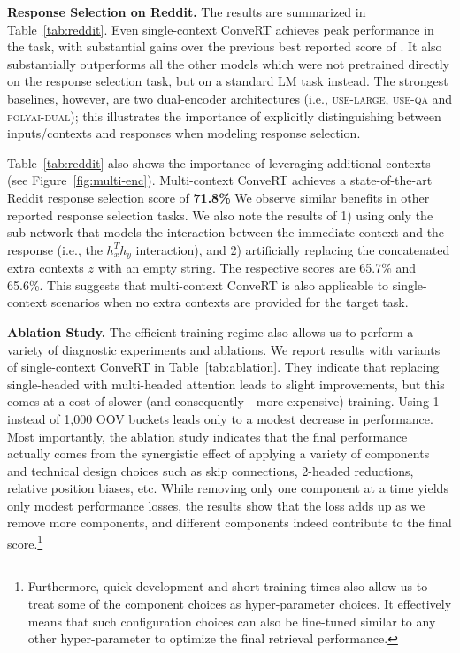 \documentclass[11pt,a4paper]{article}
\begin{document}
\vspace{1.3mm}
\noindent \textbf{Response Selection on Reddit.}
The results are summarized in Table~\ref{tab:reddit}. Even single-context ConveRT achieves peak performance in the task, with substantial gains over the previous best reported score of . It also substantially outperforms all the other models which were not pretrained directly on the response selection task, but on a standard LM task instead. The strongest baselines, however, are two dual-encoder architectures (i.e., \textsc{use-large}, \textsc{use-qa} and \textsc{polyai-dual}); this illustrates the importance of explicitly distinguishing between inputs/contexts and responses when modeling response selection. 

Table~\ref{tab:reddit} also shows the importance of leveraging additional contexts (see Figure~\ref{fig:multi-enc}). Multi-context ConveRT achieves a state-of-the-art Reddit response selection score of \textbf{71.8\%} We observe similar benefits in other reported response selection tasks. We also note the results of 1) using only the sub-network that models the interaction between the immediate context and the response (i.e., the $h_{x}^{T} h_{y}$ interaction), and 2) artificially replacing the concatenated extra contexts $z$ with an empty string. The respective scores are 65.7\% and 65.6\%. This suggests that multi-context ConveRT is also applicable to single-context scenarios when no extra contexts are provided for the target task. 

\vspace{1.3mm}
\noindent \textbf{Ablation Study.} 
The efficient training regime also allows us to perform a variety of diagnostic experiments and ablations. We report results with variants of single-context ConveRT in Table~\ref{tab:ablation}. They indicate that replacing single-headed with multi-headed attention leads to slight improvements, but this comes at a cost of slower (and consequently - more expensive) training. Using 1 instead of 1,000 OOV buckets leads only to a modest decrease in performance. Most importantly, the ablation study indicates that the final performance actually comes from the synergistic effect of applying a variety of components and technical design choices such as skip connections, 2-headed reductions, relative position biases, etc. While removing only one component at a time yields only modest performance losses, the results show that the loss adds up as we remove more components, and different components indeed contribute to the final score.\footnote{Furthermore, quick development and short training times also allow us to treat some of the component choices as hyper-parameter choices. It effectively means that such configuration choices can also be fine-tuned similar to any other hyper-parameter to optimize the final retrieval performance.}
\end{document}
